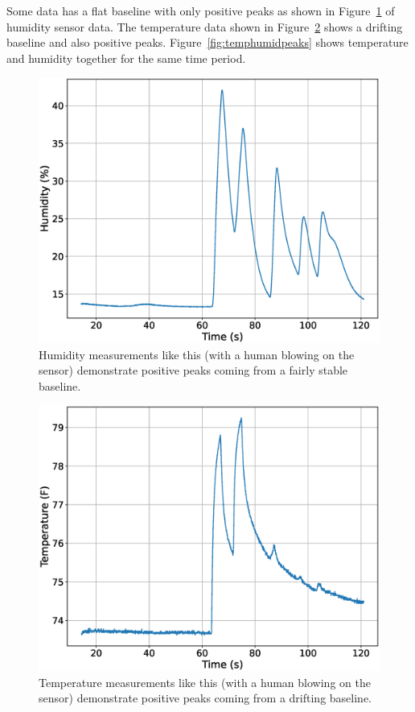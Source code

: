 Some data has a flat baseline with only positive peaks as shown in Figure~\ref{fig:humidpeaks} of 
humidity sensor data. The temperature data shown in Figure~\ref{fig:temperaturepeaks} shows a drifting baseline and 
also positive peaks. Figure~\ref{fig:temphumidpeaks} shows temperature and humidity together for the same time
period. 

\begin{figure}[!htb]
	\centering
	\includegraphics[scale=0.4]{information/humidity.eps}
	\caption{Humidity measurements like this (with a human blowing on the sensor) demonstrate 
    positive peaks coming from a fairly stable baseline.}
	\label{fig:humidpeaks}
\end{figure}

\begin{figure}[!htb]
	\centering
	\includegraphics[scale=0.4]{information/Temperature.eps}
	\caption{Temperature measurements like this (with a human blowing on the sensor) demonstrate 
    positive peaks coming from a drifting baseline.}
	\label{fig:temperaturepeaks}
\end{figure}

